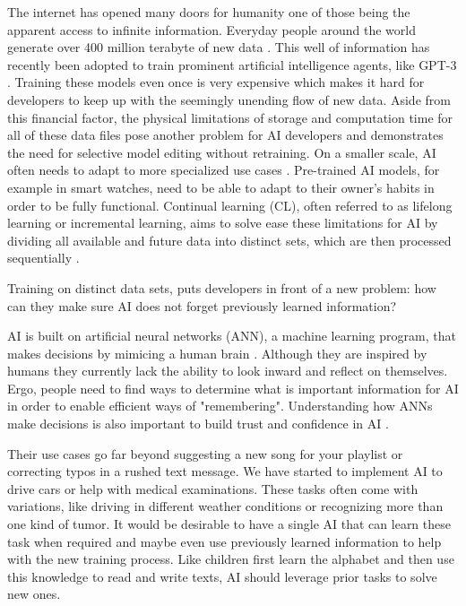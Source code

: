 The internet has opened many doors for humanity one of those being the apparent access to infinite information. Everyday people around the world generate over 400 million terabyte of new data \cite{matt2024}. This well of information has recently been adopted to train prominent artificial intelligence agents, like GPT-3 \cite{kashyap-2023}. Training these models even once is very expensive \cite{buchholz-2024} which makes it hard for developers to keep up with the seemingly unending flow of new data. Aside from this financial factor, the physical limitations of storage and computation time for all of these data files pose another problem for AI developers and demonstrates the need for selective model editing without retraining. On a smaller scale, AI often needs to adapt to more specialized use cases \cite{verwimp2024continuallearningapplicationsroad}. Pre-trained AI models, for example in smart watches, need to be able to adapt to their owner's habits in order to be fully functional.
Continual learning (CL), often referred to as lifelong learning or incremental learning, aims to solve ease these limitations for AI by dividing all available and future data into distinct sets, which are then processed sequentially \cite{verwimp2024continuallearningapplicationsroad}.

Training on distinct data sets, puts developers in front of a new problem: how can they make sure AI does not forget previously learned information? 

AI is built on artificial neural networks (ANN), a machine learning program, that makes decisions by mimicing a human brain \cite{ibm2025}. Although they are inspired by humans they currently lack the ability to look inward and reflect on themselves. Ergo, people need to find ways to determine what is important information for AI in order to enable efficient ways of "remembering". Understanding how ANNs make decisions is also important to build trust and confidence in AI \cite{Sudmann2020}. 

Their use cases go far beyond suggesting a new song for your playlist or correcting typos in a rushed text message. We have started to implement AI to drive cars or help with medical examinations. These tasks often come with variations, like driving in different weather conditions or recognizing more than one kind of tumor. It would be desirable to have a single AI that can learn these task when required and maybe even use previously learned information to help with the new training process. Like children first learn the alphabet and then use this knowledge to read and write texts, AI should leverage prior tasks to solve new ones.

